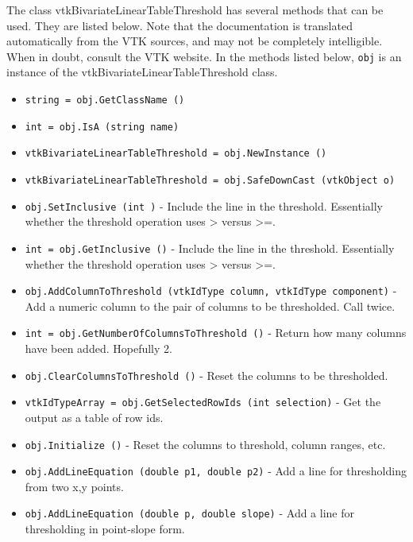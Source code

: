 The class vtkBivariateLinearTableThreshold has several methods that can be used.
  They are listed below.
Note that the documentation is translated automatically from the VTK sources,
and may not be completely intelligible.  When in doubt, consult the VTK website.
In the methods listed below, \verb|obj| is an instance of the vtkBivariateLinearTableThreshold class.
\begin{itemize}
\item  \verb|string = obj.GetClassName ()|

\item  \verb|int = obj.IsA (string name)|

\item  \verb|vtkBivariateLinearTableThreshold = obj.NewInstance ()|

\item  \verb|vtkBivariateLinearTableThreshold = obj.SafeDownCast (vtkObject o)|

\item  \verb|obj.SetInclusive (int )| -  Include the line in the threshold.  Essentially whether the threshold operation
 uses > versus >=.

\item  \verb|int = obj.GetInclusive ()| -  Include the line in the threshold.  Essentially whether the threshold operation
 uses > versus >=.

\item  \verb|obj.AddColumnToThreshold (vtkIdType column, vtkIdType component)| -  Add a numeric column to the pair of columns to be thresholded.  Call twice.

\item  \verb|int = obj.GetNumberOfColumnsToThreshold ()| -  Return how many columns have been added.  Hopefully 2.

\item  \verb|obj.ClearColumnsToThreshold ()| -  Reset the columns to be thresholded.

\item  \verb|vtkIdTypeArray = obj.GetSelectedRowIds (int selection)| -  Get the output as a table of row ids.

\item  \verb|obj.Initialize ()| -  Reset the columns to threshold, column ranges, etc.

\item  \verb|obj.AddLineEquation (double p1, double p2)| -  Add a line for thresholding from two x,y points.

\item  \verb|obj.AddLineEquation (double p, double slope)| -  Add a line for thresholding in point-slope form.


\end{itemize}

